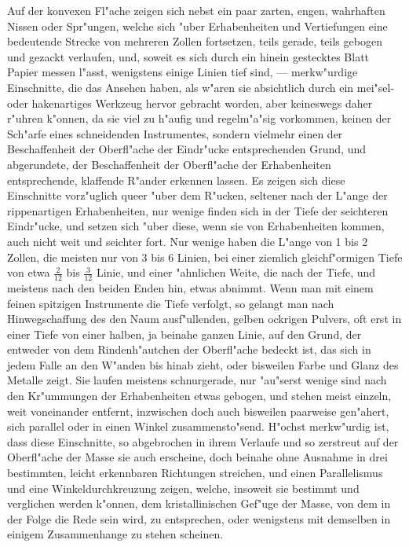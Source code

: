 \documentclass[a4paper, 11pt, oneside, german]{article}
\begin{document}
Auf der konvexen Fl"ache zeigen sich nebst ein paar zarten, engen, wahrhaften Nissen oder Spr"ungen, welche sich "uber Erhabenheiten und Vertiefungen eine bedeutende Strecke von mehreren Zollen fortsetzen, teils gerade, teils gebogen und gezackt verlaufen, und, soweit es sich durch ein hinein gestecktes Blatt Papier messen l"asst, wenigstens einige Linien tief sind, --- merkw"urdige Einschnitte, die das Ansehen haben, als w"aren sie absichtlich durch ein mei"sel- oder hakenartiges Werkzeug hervor gebracht worden, aber keineswegs daher r"uhren k"onnen, da sie viel zu h"aufig und regelm"a"sig vorkommen, keinen der Sch"arfe eines schneidenden Instrumentes, sondern vielmehr einen der Beschaffenheit der Oberfl"ache der Eindr"ucke entsprechenden Grund, und abgerundete, der Beschaffenheit der Oberfl"ache der Erhabenheiten entsprechende, klaffende R"ander erkennen lassen. Es zeigen sich diese Einschnitte vorz"uglich queer "uber dem R"ucken, seltener nach der L"ange der rippenartigen Erhabenheiten, nur wenige finden sich in der Tiefe der seichteren Eindr"ucke, und setzen sich "uber diese, wenn sie von Erhabenheiten kommen, auch nicht weit und seichter fort. Nur wenige haben die L"ange von 1 bis 2 Zollen, die meisten nur von 3 bis 6 Linien, bei einer ziemlich gleichf"ormigen Tiefe von etwa $\frac{2}{12}$ bis $\frac{3}{12}$ Linie, und einer "ahnlichen Weite, die nach der Tiefe, und meistens nach den beiden Enden hin, etwas abnimmt. Wenn man mit einem feinen spitzigen Instrumente die Tiefe verfolgt, so gelangt man nach Hinwegschaffung des den Naum ausf"ullenden, gelben ockrigen Pulvers, oft erst in einer Tiefe von einer halben, ja beinahe ganzen Linie, auf den Grund, der entweder von dem Rindenh"autchen der Oberfl"ache bedeckt ist, das sich in jedem Falle an den W"anden bis hinab zieht, oder bisweilen Farbe und Glanz des Metalle zeigt. Sie laufen meistens schnurgerade, nur "au"serst wenige sind nach den Kr"ummungen der Erhabenheiten etwas gebogen, und stehen meist einzeln, weit voneinander entfernt, inzwischen doch auch bisweilen paarweise gen"ahert, sich parallel oder in einen Winkel zusammensto"send. H"ochst merkw"urdig ist, dass diese Einschnitte, so abgebrochen in ihrem Verlaufe und so zerstreut auf der Oberfl"ache der Masse sie auch erscheine, doch beinahe ohne Ausnahme in drei bestimmten, leicht erkennbaren Richtungen streichen, und einen Parallelismus und eine Winkeldurchkreuzung zeigen, welche, insoweit sie bestimmt und verglichen werden k"onnen, dem kristallinischen Gef"uge der Masse, von dem in der Folge die Rede sein wird, zu entsprechen, oder wenigstens mit demselben in einigem Zusammenhange zu stehen scheinen.
\end{document}
